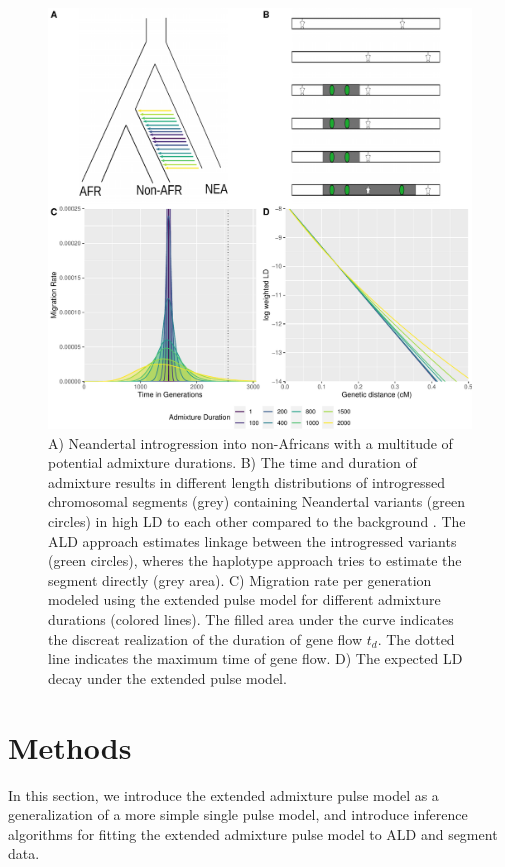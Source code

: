 \documentclass[]{article}
\begin{document}
\begin{figure}
\centering
\includegraphics{Admixture_Time_Inference_Paper_Draft_files/figure-latex/fig1-1.pdf}
\caption{\label{fig:fig1} A) Neandertal introgression into non-Africans with a multitude of potential admixture durations. B) The time and duration of admixture results in different length distributions of introgressed chromosomal segments (grey) containing  Neandertal variants (green circles)  in high LD to each other
compared to the background . The ALD approach estimates linkage
between the introgressed variants (green circles), wheres the haplotype approach tries
to estimate the segment directly (grey area). C) Migration rate per generation
modeled using the extended pulse model for different admixture durations (colored lines). The filled area under the curve indicates the discreat realization of the duration of gene flow $t_d$.
The dotted line indicates the maximum time of gene flow. D) The expected LD decay under the extended pulse model.}
\end{figure}

\section{Methods}\label{methods}
In this section,  we introduce the extended admixture pulse model as a generalization of a more simple single pulse model, and introduce inference algorithms for fitting the extended admixture pulse model to ALD and segment data. 
\end{document}
